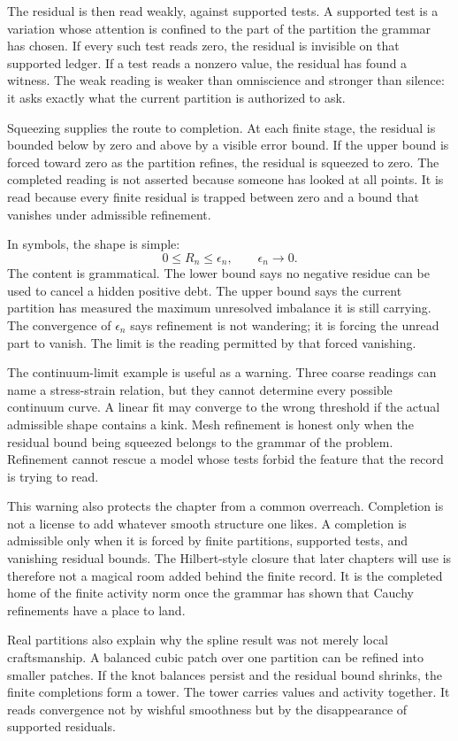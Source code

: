 The residual is then read weakly, against supported tests. A supported test
is a variation whose attention is confined to the part of the partition the
grammar has chosen. If every such test reads zero, the residual is invisible
on that supported ledger. If a test reads a nonzero value, the residual has
found a witness. The weak reading is weaker than omniscience and stronger
than silence: it asks exactly what the current partition is authorized to
ask.

Squeezing supplies the route to completion. At each finite stage, the
residual is bounded below by zero and above by a visible error bound. If the
upper bound is forced toward zero as the partition refines, the residual is
squeezed to zero. The completed reading is not asserted because someone has
looked at all points. It is read because every finite residual is trapped
between zero and a bound that vanishes under admissible refinement.

In symbols, the shape is simple:
\[
  0 \leq R_n \leq \epsilon_n,
  \qquad \epsilon_n \to 0 .
\]
The content is grammatical. The lower bound says no negative residue can be
used to cancel a hidden positive debt. The upper bound says the current
partition has measured the maximum unresolved imbalance it is still
carrying. The convergence of \(\epsilon_n\) says refinement is not wandering;
it is forcing the unread part to vanish. The limit is the reading permitted
by that forced vanishing.

The continuum-limit example is useful as a warning. Three coarse readings
can name a stress-strain relation, but they cannot determine every possible
continuum curve. A linear fit may converge to the wrong threshold if the
actual admissible shape contains a kink. Mesh refinement is honest only when
the residual bound being squeezed belongs to the grammar of the problem.
Refinement cannot rescue a model whose tests forbid the feature that the
record is trying to read.

This warning also protects the chapter from a common overreach. Completion
is not a license to add whatever smooth structure one likes. A completion is
admissible only when it is forced by finite partitions, supported tests, and
vanishing residual bounds. The Hilbert-style closure that later chapters
will use is therefore not a magical room added behind the finite record. It
is the completed home of the finite activity norm once the grammar has shown
that Cauchy refinements have a place to land.

Real partitions also explain why the spline result was not merely local
craftsmanship. A balanced cubic patch over one partition can be refined into
smaller patches. If the knot balances persist and the residual bound
shrinks, the finite completions form a tower. The tower carries values and
activity together. It reads convergence not by wishful smoothness but by the
disappearance of supported residuals.

